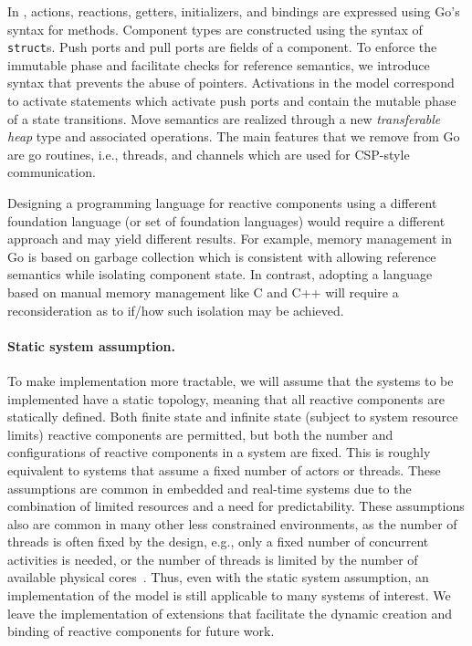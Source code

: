 In \rcgo{}, actions, reactions, getters, initializers, and bindings are expressed using Go's syntax for methods.
Component types are constructed using the syntax of \verb+struct+s.
Push ports and pull ports are fields of a component.
To enforce the immutable phase and facilitate checks for reference semantics, we introduce syntax that prevents the abuse of pointers.
Activations in the model correspond to activate statements which activate push ports and contain the mutable phase of a state transitions.
Move semantics are realized through a new \emph{transferable heap} type and associated operations.
The main features that we remove from Go are go routines, i.e., threads, and channels which are used for CSP-style communication.

Designing a programming language for reactive components using a different foundation language (or set of foundation languages) would require a different approach and may yield different results.
For example, memory management in Go is based on garbage collection which is consistent with allowing reference semantics while isolating component state.
In contrast, adopting a language based on manual memory management like C and C++ will require a reconsideration as to if/how such isolation may be achieved.

\paragraph{Static system assumption.}
To make implementation more tractable, we will assume that the systems to be implemented have a static topology, meaning that all reactive components are statically defined.
Both finite state and infinite state (subject to system resource limits) reactive components are permitted, but both the number and configurations of reactive components in a system are fixed.
This is roughly equivalent to systems that assume a fixed number of actors or threads.
These assumptions are common in embedded and real-time systems due to the combination of limited resources and a need for predictability.
These assumptions also are common in many other less constrained environments, as the number of threads is often fixed by the design, e.g., only a fixed number of concurrent activities is needed, or the number of threads is limited by the number of available physical cores~\cite{williams2012c++}.
Thus, even with the static system assumption, an implementation of the model is still applicable to many systems of interest.
We leave the implementation of extensions that facilitate the dynamic creation and binding of reactive components for future work.

